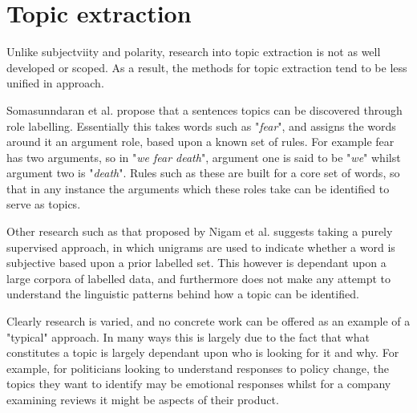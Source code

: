 \begin{comment}

Using adverbs for grading - Benamara et al. \cite{Benamara:2007wz} 

Subjectivity does not necessarily imply a polarised opinion

Broad overview in \cite{Pang:2008wj}

Phrase level sentiment analysis \cite{Wilson:2005tt}

Movie reviews, thumbs up/down \cite{Turney:2002vv} \cite{Pang:2002tu}

\end{comment}

\section{Topic extraction}
\label{background:topic_extraction}

Unlike subjectviity and polarity, research into topic extraction is not as well developed or scoped. As a result, the methods for topic extraction tend to be less unified in approach.

Somasunndaran et al. \cite{Somasundaran:2008tw} propose that a sentences topics can be discovered through role labelling. Essentially this takes words such as "\emph{fear}", and assigns the words around it an argument role, based upon a known set of rules. For example fear has two arguments, so in "\emph{we fear death}", argument one is said to be "\emph{we}" whilst argument two is "\emph{death}". Rules such as these are built for a core set of words, so that in any instance the arguments which these roles take can be identified to serve as topics.

Other research such as that proposed by Nigam et al. \cite{Nigam:2004ur} suggests taking a purely supervised approach, in which unigrams are used to indicate whether a word is subjective based upon a prior labelled set. This however is dependant upon a large corpora of labelled data, and furthermore does not make any attempt to understand the linguistic patterns behind how a topic can be identified.

Clearly research is varied, and no concrete work can be offered as an example of a "typical" approach. In many ways this is largely due to the fact that what constitutes a topic is largely dependant upon who is looking for it and why. For example, for politicians looking to understand responses to policy change, the topics they want to identify may be emotional responses whilst for a company examining reviews it might be aspects of their product.

